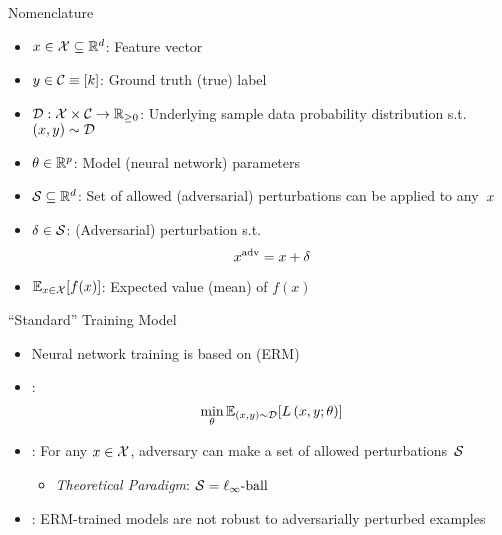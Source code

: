 \begin{frame}{Nomenclature}
    

  \begin{itemize}[<+->]
    \setlength{\itemsep}{6pt}
  \item ${x \in \mathcal{X} \subseteq \mathbb{R}^d}$: Feature vector
    \item ${y \in \mathcal{C} \equiv {\lbrack k\rbrack}}$: Ground truth (true) label
    \item ${\mathcal{D}:\mathcal{X} \times \mathcal{C}\rightarrow\mathbb{R}_{{\geq}0}}$: Underlying sample data probability distribution s.t.\ ${(x,y) \sim \mathcal{D}}$

    \vspace{6pt}
    \item ${\theta \in \mathbb{R}^{p}}$: Model (neural network) parameters

    \vspace{6pt}
  \item ${\mathcal{S} \subseteq \mathbb{R}^{d}}$: Set of allowed (adversarial) perturbations can be applied to any~$x$
    \item ${\delta \in \mathcal{S}}$: (Adversarial) perturbation s.t.
      \begin{equation}\label{eq:AdversarialX}
        x^{\text{adv}} = x + \delta
      \end{equation}

    \vspace{6pt}
    \item $\mathbb{E}_{x \in \mathcal{X}}\lbrack f(x)\rbrack$: Expected value (mean) of $f(x)$
  \end{itemize}
\end{frame}


\begin{frame}{``Standard'' Training Model}
  \begin{itemize}[<+->]
    \setlength{\itemsep}{20pt}
    \item Neural network training is based on \textit{} (ERM)
    \item \textbf{}:
      \begin{equation}\label{eq:ERM}
        \min_{\theta} \mathbb{E}_{(x,y) \sim \mathcal{D}} \lbrack L \left( x, y ; \theta \right)\rbrack
      \end{equation}

    \item \textit{}: For any ${x \in \mathcal{X}}$, adversary can make a set of allowed perturbations~$\mathcal{S}$
      \begin{itemize}
        \item \textit{Theoretical Paradigm}: $\mathcal{S} = \ell_{\infty}\text{-ball}$
      \end{itemize}

    \item \textbf{}: ERM-trained models are not robust to adversarially perturbed examples~\cite{Biggio:2013,Szegedy:2013}
  \end{itemize}
\end{frame}


